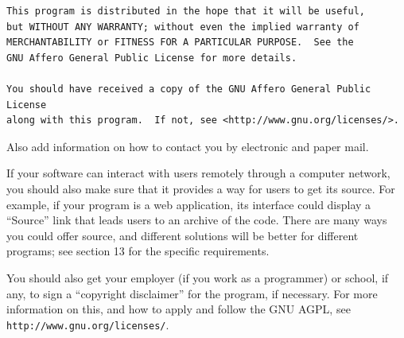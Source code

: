 \documentclass[a4paper,twocolumn]{article}
\begin{document}
\begin{enumerate}
{\begin{verbatim}
This program is distributed in the hope that it will be useful,
but WITHOUT ANY WARRANTY; without even the implied warranty of
MERCHANTABILITY or FITNESS FOR A PARTICULAR PURPOSE.  See the
GNU Affero General Public License for more details.

You should have received a copy of the GNU Affero General Public License
along with this program.  If not, see <http://www.gnu.org/licenses/>.
\end{verbatim}
}

Also add information on how to contact you by electronic and paper mail.

If your software can interact with users remotely through a computer
network, you should also make sure that it provides a way for users to
get its source.  For example, if your program is a web application, its
interface could display a ``Source'' link that leads users to an archive
of the code.  There are many ways you could offer source, and different
solutions will be better for different programs; see section 13 for the
specific requirements.

You should also get your employer (if you work as a programmer) or
school, if any, to sign a ``copyright disclaimer'' for the program, if
necessary.  For more information on this, and how to apply and follow
the GNU AGPL, see \texttt{http://www.gnu.org/licenses/}.

\end{enumerate}
\end{document}
